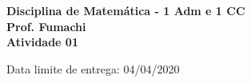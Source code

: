 \documentclass{article}
\begin{document}
\pagestyle{empty}






\begin{center}\textbf{\Large{Disciplina de Matemática - 1 Adm e 1 CC \\ Prof. Fumachi \\ \vspace{0.5cm} Atividade 01}}\end{center}
\begin{center}\large{Data limite de entrega: 04/04/2020}\end{center}
	
\end{document}
